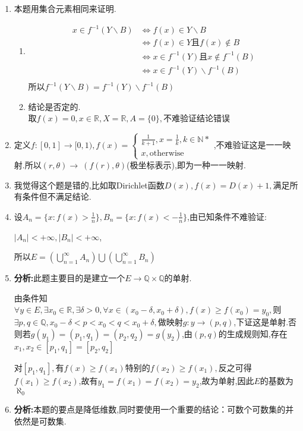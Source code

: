 \documentclass[UTF8, a4paper, 12pt, oneside, onecolumn]{article}
\numberwithin{equation}{section}
\numberwithin{figure}{section}
\numberwithin{table}{section}
\theoremstyle{nonumberplain}	%
\theoremstyle{plain}	%
\theoremstyle{plain}	%
\theoremstyle{plain}	%
\theoremstyle{plain}	%
\theoremstyle{nonumberplain}
\begin{document}
\begin{enumerate}
	\item 本题用集合元素相同来证明.
	\begin{enumerate}
		\item \begin{align*}
			x\in f^{-1}(Y\backslash B)&\Longleftrightarrow f(x)\in Y\backslash B\\
			&\Longleftrightarrow f(x)\in Y\text{且}f(x)\notin B\\
			&\Longleftrightarrow x\in f^{-1}(Y)\text{且}x\notin f^{-1}(B)\\
			&\Longleftrightarrow x\in f^{-1}(Y)\backslash f^{-1}(B)\\
		\end{align*}
		所以$f^{-1}(Y\backslash B)=f^{-1}(Y)\backslash f^{-1}(B)$
		\item 结论是否定的.\\
		取$f(x)=0,x\in \mathbb{R},X=\mathbb{R},A=\{0\},$不难验证结论错误
	\end{enumerate}
	\item 定义$f:[0,1]\rightarrow [0,1),f(x)=\left\{ \begin{array}{c} \displaystyle \frac{1}{k+1},x=\frac{1}{k},k\in\mathbb{N*}\\x,\text{otherwise}\end{array}\right.$,不难验证这是一一映射.所以$(r,\theta)\rightarrow~(f(r),\theta)$(极坐标表示),即为一种一一映射.
	\item 我觉得这个题是错的,比如取Dirichlet函数$D(x),f(x)=D(x)+1,$满足所有条件但不满足结论.
	\item 设$\displaystyle A_n=\{x:f(x)>\frac{1}{n}\},B_n=\{x:f(x)<-\frac{1}{n}\}$,由已知条件不难验证:
	
	$|A_n|<+\infty,|B_n|<+\infty$,
	
	所以$\displaystyle E=(\bigcup_{n=1}^{\infty}A_n)\bigcup(\bigcup_{n=1}^{\infty}B_n)$
	\item {\bf 分析:}此题主要目的是建立一个$E\rightarrow \mathbb{Q}\times \mathbb{Q}$的单射.
	
	由条件知$\forall y\in E,\exists x_0\in \mathbb{R},\exists  \delta>0,\forall x \in(x_0-\delta,x_0+\delta),f(x)\geqslant f(x_0)=y_0,$则$\exists p,q\in\mathbb{Q},x_0-\delta<p<x_0<q<x_0+\delta,$做映射$g:y\rightarrow (p,q)$,下证这是单射.否则若$g(y_1)=(p_1,q_1)=(p_2,q_2)=g(y_2)$,由$(p,q)$的生成规则知,存在$x_1,x_2\in [p_1,q_1]=[p_2,q_2]$
	
	对$[p_1,q_1],$有$f(x)\geqslant f(x_1)$特别的$f(x_2)\geqslant f(x_1),$反之可得$f(x_1)\geqslant f(x_2)$,故有$y_1=f(x_1)=f(x_2)=y_2$,故为单射,因此$E$的基数为$\aleph_0$
	\item {\bf   分析:}本题的要点是降低维数,同时要使用一个重要的结论：可数个可数集的并依然是可数集.
	

\end{enumerate}
\end{document}
